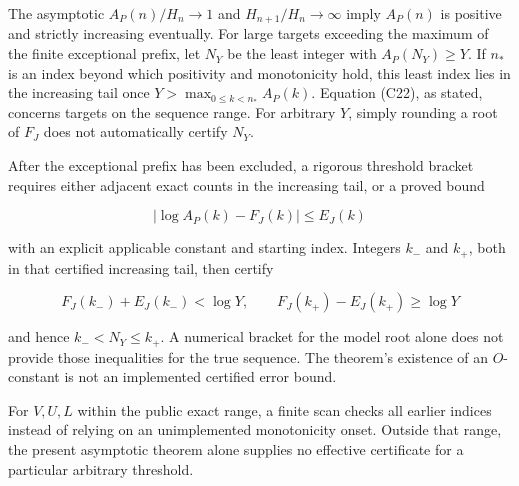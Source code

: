 The asymptotic \(A_P(n)/H_n\to1\) and \(H_{n+1}/H_n\to\infty\) imply
\(A_P(n)\) is positive and strictly increasing eventually. For large
targets exceeding the maximum of the finite exceptional prefix, let
\(N_Y\) be the least integer with \(A_P(N_Y)\ge Y\).
If $n_*$ is an index beyond which positivity and monotonicity hold, this
least index lies in the increasing tail once
$Y>\max_{0\le k<n_*}A_P(k)$.
Equation (C22), as stated, concerns targets on the sequence range. For
arbitrary \(Y\), simply rounding a root of \(F_J\) does not
automatically certify \(N_Y\).

After the exceptional prefix has been excluded, a rigorous threshold
bracket requires either adjacent exact counts in the increasing tail, or a
proved bound

\[
 |\log A_P(k)-F_J(k)|\le E_J(k)
\]

with an explicit applicable constant and starting index. Integers
\(k_-\) and \(k_+\), both in that certified increasing tail, then certify

\[
 F_J(k_-)+E_J(k_-)<\log Y,\qquad
 F_J(k_+)-E_J(k_+)\ge\log Y
\]

and hence \(k_-<N_Y\le k_+\). A numerical bracket for the model root
alone does not provide those inequalities for the true sequence. The
theorem's existence of an \(O\)-constant is not an implemented
certified error bound.

For $V,U,L$ within the public exact range, a finite scan checks all earlier
indices instead of relying on an unimplemented monotonicity onset. Outside
that range, the present asymptotic theorem alone supplies no effective
certificate for a particular arbitrary threshold.

